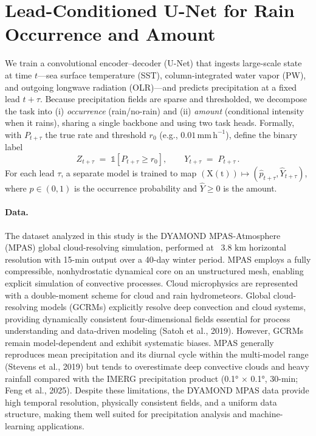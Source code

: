 \documentclass{article}
\begin{document}
\section{Lead-Conditioned U-Net for Rain Occurrence and Amount}

We train a convolutional encoder--decoder (U-Net) that ingests large-scale state at time \(t\)---sea surface temperature (SST), column-integrated water vapor (PW), and outgoing longwave radiation (OLR)---and predicts precipitation at a fixed lead \(t+\tau\). Because precipitation fields are sparse and thresholded, we decompose the task into (i) \emph{occurrence} (rain/no-rain) and (ii) \emph{amount} (conditional intensity when it rains), sharing a single backbone and using two task heads. Formally, with \(P_{t+\tau}\) the true rate and threshold \(r_0\) (e.g., \(0.01\,\mathrm{mm\,h^{-1}}\)), define the binary label
\[
Z_{t+\tau} \;=\; \mathbb{1}\!\left[P_{t+\tau}\ge r_0\right],
\qquad
Y_{t+\tau} \;=\; P_{t+\tau}\, .
\]
For each lead \(\tau\), a separate model is trained to map \((\mathrm{X(t)})\mapsto (\widehat{p}_{t+\tau}, \widehat{Y}_{t+\tau})\), where \(\widehat{p}\in(0,1)\) is the occurrence probability and \(\widehat{Y}\ge 0\) is the amount.

\paragraph{Data.}
The dataset analyzed in this study is the DYAMOND MPAS-Atmosphere (MPAS) global cloud-resolving simulation, performed at ~3.8 km horizontal resolution with 15-min output over a 40-day winter period. MPAS employs a fully compressible, nonhydrostatic dynamical core on an unstructured mesh, enabling explicit simulation of convective processes. Cloud microphysics are represented with a double-moment scheme for cloud and rain hydrometeors. Global cloud-resolving models (GCRMs) explicitly resolve deep convection and cloud systems, providing dynamically consistent four-dimensional fields essential for process understanding and data-driven modeling (Satoh et al., 2019). However, GCRMs remain model-dependent and exhibit systematic biases. MPAS generally reproduces mean precipitation and its diurnal cycle within the multi-model range (Stevens et al., 2019) but tends to overestimate deep convective clouds and heavy rainfall compared with the IMERG precipitation product (0.1° × 0.1°, 30-min; Feng et al., 2025). Despite these limitations, the DYAMOND MPAS data provide high temporal resolution, physically consistent fields, and a uniform data structure, making them well suited for precipitation analysis and machine-learning applications.
\end{document}
